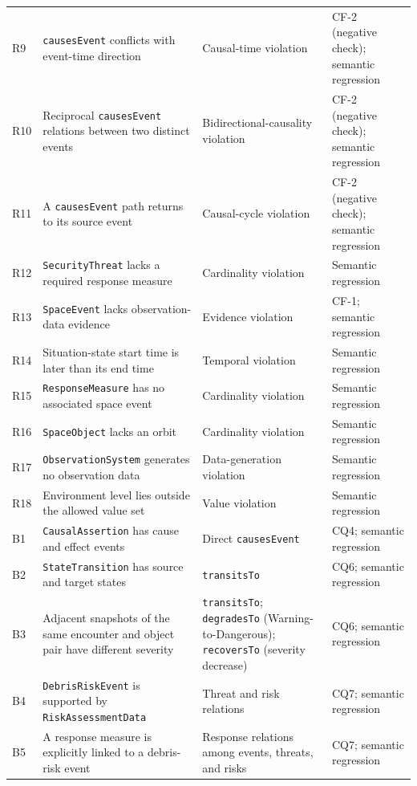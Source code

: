 \documentclass[Royal,sageh,times]{sagej}
\newcommand{\ont}[1]{{\urlstyle{tt}\nolinkurl{#1}}}
\begin{document}
\begin{longtable}{@{}>{\raggedright\arraybackslash}p{}>{\raggedright\arraybackslash}p{}>{\raggedright\arraybackslash}p{}>{\raggedright\arraybackslash}p{}@{}}
    R9 &
    \ont{causesEvent} conflicts with event-time direction &
    Causal-time violation &
    CF-2 (negative check); semantic regression \\
    R10 &
    Reciprocal \ont{causesEvent} relations between two distinct events &
    Bidirectional-causality violation &
    CF-2 (negative check); semantic regression \\
    R11 &
    A \ont{causesEvent} path returns to its source event &
    Causal-cycle violation &
    CF-2 (negative check); semantic regression \\
    R12 &
    \ont{SecurityThreat} lacks a required response measure &
    Cardinality violation &
    Semantic regression \\
    R13 &
    \ont{SpaceEvent} lacks observation-data evidence &
    Evidence violation &
    CF-1; semantic regression \\
    R14 &
    Situation-state start time is later than its end time &
    Temporal violation &
    Semantic regression \\
    R15 &
    \ont{ResponseMeasure} has no associated space event &
    Cardinality violation &
    Semantic regression \\
    R16 &
    \ont{SpaceObject} lacks an orbit &
    Cardinality violation &
    Semantic regression \\
    R17 &
    \ont{ObservationSystem} generates no observation data &
    Data-generation violation &
    Semantic regression \\
    R18 &
    Environment level lies outside the allowed value set &
    Value violation &
    Semantic regression \\
    B1 &
    \ont{CausalAssertion} has cause and effect events &
    Direct \ont{causesEvent} &
    CQ4; semantic regression \\
    B2 &
    \ont{StateTransition} has source and target states &
    \ont{transitsTo} &
    CQ6; semantic regression \\
    B3 &
    Adjacent snapshots of the same encounter and object pair have different severity &
    \ont{transitsTo}; \ont{degradesTo} (Warning-to-Dangerous); \ont{recoversTo} (severity decrease) &
    CQ6; semantic regression \\
    B4 &
    \ont{DebrisRiskEvent} is supported by \ont{RiskAssessmentData} &
    Threat and risk relations &
    CQ7; semantic regression \\
    B5 &
    A response measure is explicitly linked to a debris-risk event &
    Response relations among events, threats, and risks &
    CQ7; semantic regression \\
    
  \end{longtable}
\endgroup
\end{document}
